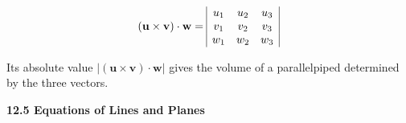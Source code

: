 \documentclass[12pt]{article}
\renewcommand{\vec}[1]{\mathbf{#1}}
\newcommand{\<}{\left<}
\renewcommand{\>}{\right>}
\begin{document}
\begin{itemize}
    \[
    (\vec{u}\times\vec{v})\cdot\vec{w} =
    \begin{array}{|c c c|}
    u_1 & u_2 & u_3 \\
    v_1 & v_2 & v_3 \\
    w_1 & w_2 & w_3 \\
    \end{array}
    \]
    
    Its absolute value $|(\vec{u}\times\vec{v})\cdot\vec{w}|$ gives the volume of a parallelpiped determined by the three vectors.
    
    \end{itemize}

\newpage

\centerline{\bf 12.5 Equations of Lines and Planes}
  
\end{document}
